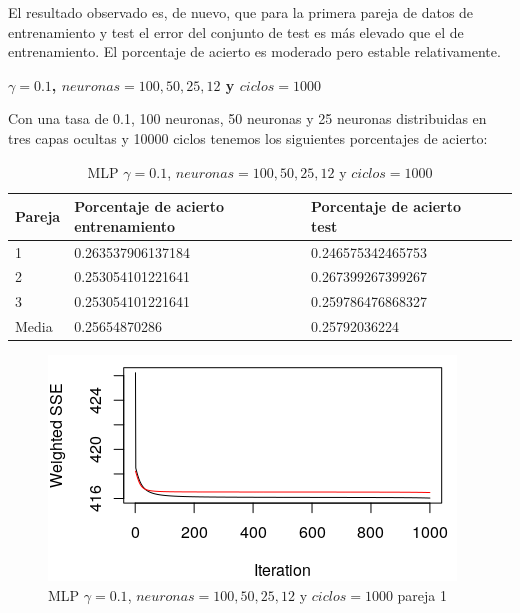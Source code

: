 \documentclass[11pt,spanish,listoffigures,listoftables]{workluis}
\begin{document}
\par El resultado observado es, de nuevo, que para la primera pareja de datos de entrenamiento y test el error del conjunto de test es más elevado que el de entrenamiento. El porcentaje de acierto es moderado pero estable relativamente.


\par \textbf{$\gamma = 0.1$, $neuronas = 100,50,25,12$ y $ciclos = 1000$}

\par Con una tasa de 0.1, 100 neuronas, 50 neuronas y 25 neuronas distribuidas en tres capas ocultas y 10000 ciclos tenemos los siguientes porcentajes de acierto:

\begin{table}[H]
\centering
\caption{MLP $\gamma = 0.1$, $neuronas = 100,50,25,12$ y $ciclos = 1000$}
\label{tb:tb5}
\begin{tabular}{lllll}
\hline
\multicolumn{1}{|l|}{Pareja} & Porcentaje de acierto entrenamiento & Porcentaje de acierto test  \\ \hline \hline
1                            & 0.263537906137184    & 0.246575342465753 \\
2                            & 0.253054101221641    & 0.267399267399267 \\
3                            & 0.253054101221641    & 0.259786476868327 \\
Media                        & 0.25654870286        & 0.25792036224     \\ \hline
\end{tabular}
\end{table}

\begin{figure}[H]
\centering
\includegraphics[scale=0.5]{011005025121}
\caption{MLP $\gamma = 0.1$, $neuronas = 100,50,25,12$ y $ciclos = 1000$ pareja 1}
\end{figure} 
\end{document}
